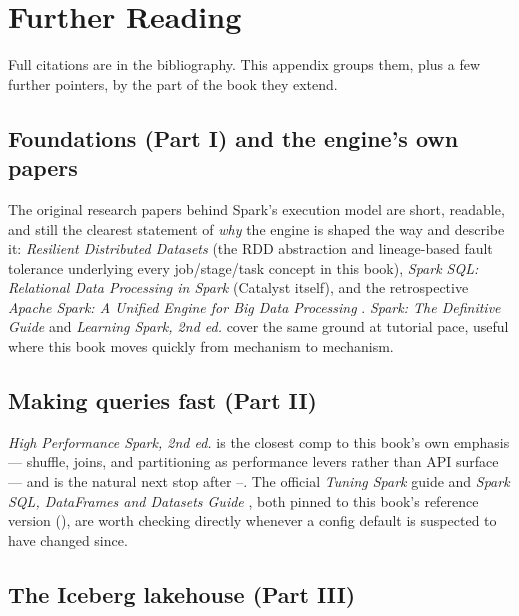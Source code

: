 \chapter{Further Reading}
\label{app:reading}

Full citations are in the bibliography. This appendix groups them, plus a
few further pointers, by the part of the book they extend.

\section*{Foundations (Part I) and the engine's own papers}

The original research papers behind Spark's execution model are short,
readable, and still the clearest statement of \emph{why} the engine is
shaped the way  and  describe it:
\emph{Resilient Distributed Datasets} \cite{ZahariaEtAl2012} (the RDD
abstraction and lineage-based fault tolerance underlying every job/stage/task
concept in this book), \emph{Spark SQL: Relational Data Processing in Spark}
\cite{ArmbrustEtAl2015} (Catalyst itself), and the retrospective
\emph{Apache Spark: A Unified Engine for Big Data Processing}
\cite{ZahariaEtAl2016}. \emph{Spark: The Definitive Guide}
\cite{ChambersZaharia2018} and \emph{Learning Spark, 2nd ed.}
\cite{DamjiEtAl2020} cover the same ground at tutorial pace, useful where
this book moves quickly from mechanism to mechanism.

\section*{Making queries fast (Part II)}

\emph{High Performance Spark, 2nd ed.} \cite{KarauEtAl2026} is the closest
comp to this book's own emphasis --- shuffle, joins, and partitioning as
performance levers rather than API surface --- and is the natural next
stop after --. The official
\emph{Tuning Spark} guide \cite{SparkTuningGuide} and
\emph{Spark SQL, DataFrames and Datasets Guide} \cite{SparkSQLGuide}, both
pinned to this book's reference version (), are worth
checking directly whenever a config default is suspected to have changed
since.

\section*{The Iceberg lakehouse (Part III)}

